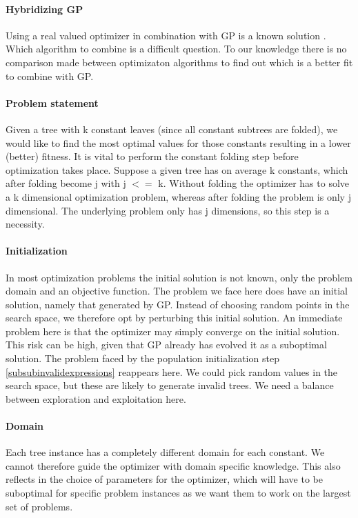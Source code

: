 \paragraph{Hybridizing GP}
Using a real valued optimizer in combination with GP is a known solution \cite{GEDE, GPConst}.
Which algorithm to combine is a difficult question. To our knowledge there is no comparison made between optimizaton algorithms to find out which is a better fit to combine with GP. 

\paragraph{Problem statement}
Given a tree with k constant leaves (since all constant subtrees are folded), we would like to find the most optimal values for those constants resulting in a lower (better) fitness. 
It is vital to perform the constant folding step before optimization takes place. Suppose a given tree has on average k constants, which after folding become j with j $<=$ k. Without folding the optimizer has to solve a k dimensional optimization problem, whereas after folding the problem is only j dimensional. The underlying problem only has j dimensions, so this step is a necessity.

\paragraph{Initialization}
In most optimization problems the initial solution is not known, only the problem domain and an objective function. The problem we face here does have an initial solution, namely that generated by GP. Instead of choosing random points in the search space, we therefore opt by perturbing this initial solution. An immediate problem here is that the optimizer may simply converge on the initial solution. This risk can be high, given that GP already has evolved it as a suboptimal solution. 
The problem faced by the population initialization step \ref{subsubinvalidexpressions} reappears here. We could pick random values in the search space, but these are likely to generate invalid trees. We need a balance between exploration and exploitation here. 

\paragraph{Domain}
Each tree instance has a completely different domain for each constant. We cannot therefore guide the optimizer with domain specific knowledge. This also reflects in the choice of parameters for the optimizer, which will have to be suboptimal for specific problem instances as we want them to work on the largest set of problems.


